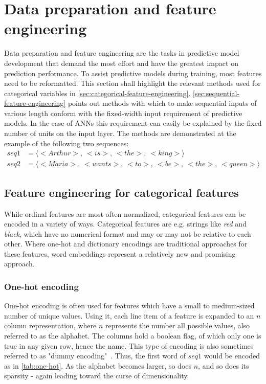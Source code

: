 \section{Data preparation and feature engineering}
\label{sec:background:feature-engineering}
Data preparation and feature engineering are the tasks in predictive model development that demand the most effort and have the greatest impact on prediction performance. To assist predictive models during training, most features need to be reformatted. This section shall highlight the relevant methods used for categorical variables in \autoref{sec:categorical-feature-engineering}. \autoref{sec:sequential-feature-engineering} points out methods with which to make sequential inputs of various length conform with the fixed-width input requirement of predictive models. In the case of ANNs this requirement can easily be explained by the fixed number of units on the input layer. The methods are demonstrated at the example of the following two sequences:
\begin{equation*}
    \begin{split}
        seq1 &= \langle<Arthur>,\ <is>,\ <the>,\ <king>\rangle\\
        seq2 &= \langle<Maria>,\ <wants>,\ <to>,\ <be>,\ <the>,\ <queen>\rangle
    \end{split}
\end{equation*}

\subsection{Feature engineering for categorical features}
\label{sec:categorical-feature-engineering}
While ordinal features are most often normalized, categorical features can be encoded in a variety of ways. Categorical features are e.g. strings like \textit{red} and \textit{black}, which have no numerical format and may or may not be relative to each other. Where one-hot and dictionary encodings are traditional approaches for these features, word embeddings represent a relatively new and promising approach.

\subsubsection*{One-hot encoding}
One-hot encoding is often used for features which have a small to medium-sized number of unique values. Using it, each line item of a feature is expanded to an $n$ column representation, where $n$ represents the number all possible values, also referred to as the alphabet. The columns hold a boolean flag, of which only one is true in any given row, hence the name. This type of encoding is also sometimes referred to as "dummy encoding"~\cite{web:pandas-get-dummies}. Thus, the first word of $seq1$ would be encoded as in \autoref{tab:one-hot}. As the alphabet becomes larger, so does $n$, and so does its sparsity - again leading toward the curse of dimensionality.

